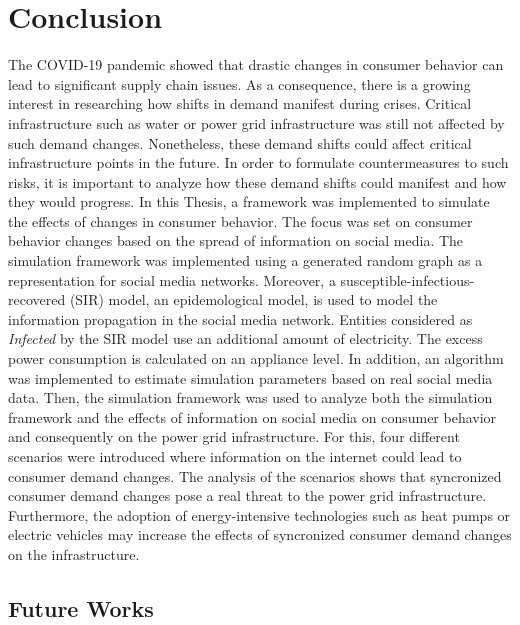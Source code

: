 \chapter{Conclusion}
\label{conclusion}

The COVID-19 pandemic showed that drastic changes in 
consumer behavior can lead to significant supply chain issues.
As a consequence, there is a growing interest in researching 
how shifts in demand manifest during crises. 
Critical infrastructure such as water or power grid 
infrastructure was still not affected by such demand changes.
Nonetheless, these demand shifts could affect critical 
infrastructure points in the future. In order to 
formulate countermeasures to such risks, it is 
important to analyze how these demand shifts could 
manifest and how they would progress. In this Thesis,
a framework was implemented to simulate the effects of 
changes in consumer behavior. The focus was set on
consumer behavior changes based on the spread
of information on social media. 
The simulation framework was implemented using 
a generated random graph as a representation for social 
media networks. Moreover, a susceptible-infectious-recovered 
(SIR) model, an epidemological model, is used to model 
the information propagation in the social media network.
Entities considered as \textit{Infected}
by the SIR model use an additional amount of 
electricity. The excess power consumption is 
calculated on an appliance level.
In addition, an algorithm was implemented to estimate 
simulation parameters based on real social media 
data. Then, the simulation framework was
used to analyze both the simulation framework and
the effects of information 
on social media on consumer behavior and 
consequently on the power grid infrastructure.
 For this, four different 
scenarios were introduced where information
on the internet could lead to consumer demand
changes. 
The analysis of the scenarios 
shows that syncronized consumer
demand changes pose a real threat to the power
grid infrastructure. Furthermore, the adoption
of energy-intensive technologies such as heat
pumps or electric vehicles may increase the 
effects of syncronized consumer demand changes
on the infrastructure.

\section{Future Works}

